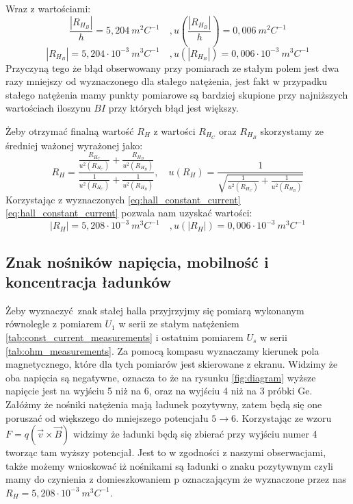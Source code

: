 \documentclass[12pt]{article}
\begin{document}
Wraz z wartościami:
\[
    \frac{|R_{H_B}|}{h} = 5{,}204 \ m^2C^{-1} \quad, u(\frac{|R_{H_B}|}{h}) = 0{,}006 \ m^2C^{-1}  
\]
\begin{equation}
    |R_{H_B}| = 5{,}204 \cdot10^{-3} \ m^3C^{-1} \quad, u(|R_{H_B}|) = 0{,}006 \cdot10^{-3} \ m^3C^{-1}  
    \label{eq:hall_constant_field}
\end{equation}
Przyczyną tego że błąd obserwowany przy pomiarach ze stałym polem jest dwa razy mniejszy od wyznaczonego dla stałego natężenia, 
jest fakt w przypadku stałego natężenia mamy punkty pomiarowe są bardziej skupione przy najniższych wartościach iloszynu $BI$ przy których błąd jest większy.


Żeby otrzymać finalną wartość $R_H$ z wartości $R_{H_C}$ oraz $R_{H_B}$ skorzystamy ze średniej ważonej wyrażonej jako:
\[
    R_H = \frac{\frac{R_{H_C}}{u^2(R_{H_C})}+\frac{R_{H_B}}{u^2(R_{H_B})}}{\frac{1}{u^2(R_{H_C})}+\frac{1}{u^2(R_{H_B})}}, \quad u(R_H) = \frac{1}{\sqrt{\frac{1}{u^2(R_{H_C})}+\frac{1}{u^2(R_{H_B})}}}
\]
Korzystając z wyznaczonych \ref{eq:hall_constant_current}\ref{eq:hall_constant_current} pozwala nam uzyskać wartości:
\begin{equation} 
    |R_H| = 5{,}208 \cdot10^{-3} \ m^3C^{-1} \quad, u(|R_H|) = 0{,}006 \cdot10^{-3} \ m^3C^{-1}  
    \label{eq:hall_const}
\end{equation}


\subsection{Znak nośników napięcia, mobilność i koncentracja ładunków}
Żeby wyznaczyć znak stałej halla przyjrzyjmy się pomiarą wykonanym równolegle z pomiarem $U_1$ w serii ze stałym natężeniem \ref{tab:const_current_measurements} i ostatnim pomiarem $U_s$ w serii \ref{tab:ohm_measurements}. 
Za pomocą kompasu wyznaczamy kierunek pola magnetycznego, które dla tych pomiarów jest skierowane z ekranu.
Widzimy że oba napięcia są negatywne, oznacza to że na rysunku \ref{fig:diagram} wyższe napięcie jest na wyjściu 5 niż na 6, oraz na wyjściu 4 niż na 3 próbki Ge.
Załóżmy że nośniki natężenia mają ładunek pozytywny, zatem będą się one poruszać od większego do mniejszego potencjału $5 \rightarrow 6$. 
Korzystając ze wzoru $F=q(\vec{v}\times\vec{B})$ widzimy że ładunki będą się zbierać przy wyjściu numer 4 tworząc tam wyższy potencjał.
Jest to w zgodności z naszymi obserwacjami, także możemy wnioskować iż nośnikami są ładunki o znaku pozytywnym czyli mamy do czynienia z domieszkowaniem p oznaczającym że wyznaczone przez nas $R_H =  5{,}208 \cdot10^{-3} \ m^3C^{-1}$.
\end{document}
